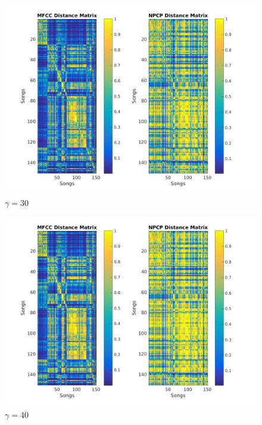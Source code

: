 \documentclass[11pt, a4paper]{article}
\begin{document}
\begin{figure}[H]
\hspace*{-2cm}    
    \centering
    \includegraphics[width=1.25\textwidth]{gamma30.png}
    \caption{$\gamma = 30$}
\end{figure}

\begin{figure}[H]
\hspace*{-2cm}    
    \centering
    \includegraphics[width=1.25\textwidth]{gamma40.png}
    \caption{$\gamma = 40$}
\end{figure}
\end{document}
